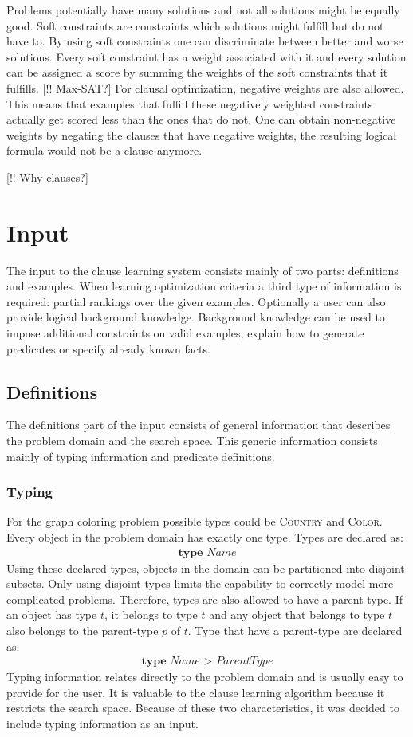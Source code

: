Problems potentially have many solutions and not all solutions might be equally good.
Soft constraints are constraints which solutions might fulfill but do not have to.
By using soft constraints one can discriminate between better and worse solutions.
Every soft constraint has a weight associated with it and every solution can be assigned a score by summing the weights of the soft constraints that it fulfills.
[!! Max-SAT?] For clausal optimization, negative weights are also allowed.
This means that examples that fulfill these negatively weighted constraints actually get scored less than the ones that do not.
One can obtain non-negative weights by negating the clauses that have negative weights, the resulting logical formula would not be a clause anymore.

[!! Why clauses?]

\section{Input}
The input to the clause learning system consists mainly of two parts: definitions and examples.
When learning optimization criteria a third type of information is required: partial rankings over the given examples.
Optionally a user can also provide logical background knowledge.
Background knowledge can be used to impose additional constraints on valid examples, explain how to generate predicates or specify already known facts.

\subsection{Definitions}
The definitions part of the input consists of general information that describes the problem domain and the search space.
This generic information consists mainly of typing information and predicate definitions.

\subsubsection{Typing}
For the graph coloring problem possible types could be \textsc{Country} and \textsc{Color}.
Every object in the problem domain has exactly one type.
Types are declared as:
\begin{align*}
\textbf{type } Name
\end{align*}
Using these declared types, objects in the domain can be partitioned into disjoint subsets.
Only using disjoint types limits the capability to correctly model more complicated problems.
Therefore, types are also allowed to have a parent-type.
If an object has type $t$, it belongs to type $t$ and any object that belongs to type $t$ also belongs to the parent-type $p$ of $t$.
Type that have a parent-type are declared as:
\begin{align*}
\textbf{type } Name \textbf{ > } ParentType
\end{align*}
Typing information relates directly to the problem domain and is usually easy to provide for the user.
It is valuable to the clause learning algorithm because it restricts the search space.
Because of these two characteristics, it was decided to include typing information as an input.

